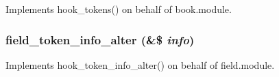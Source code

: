 \label{token_8tokens_8inc_a107b610501b0cf966d8b2df90becf740}
Implements hook\_\-tokens() on behalf of book.module. \hypertarget{token_8tokens_8inc_ac1ef025e605f22d4beca380e26783ec8}{
\subsubsection[{field\_\-token\_\-info\_\-alter}]{\setlength{\rightskip}{0pt plus 5cm}field\_\-token\_\-info\_\-alter (\&\$ {\em info})}}
\label{token_8tokens_8inc_ac1ef025e605f22d4beca380e26783ec8}
Implements hook\_\-token\_\-info\_\-alter() on behalf of field.module.

